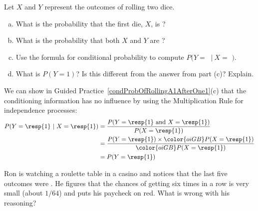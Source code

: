 \begin{exercisewrap}
\begin{nexercise} \label{condProbOfRollingA1AfterOne1}
Let $X$ and $Y$ represent the outcomes of rolling two dice.\footnotemark
\begin{enumerate}[(a)]
\item What is the probability that the first die, $X$, is ?
\item What is the probability that both $X$ and $Y$ are ?
\item Use the formula for conditional probability to compute $P(Y =$ $\ |\ X = $ $)$.
\item What is $P(Y=1)$? Is this different from the answer from part (c)? Explain.
\end{enumerate}
\end{nexercise}
\end{exercisewrap}

We can show in Guided Practice~\ref{condProbOfRollingA1AfterOne1}(c) that the conditioning information has no influence by using the Multiplication Rule for independence processes:
\begin{align*}
P(Y=\text{\resp{1}}\ |\ X=\text{\resp{1}})
    &= \frac{P(Y=\text{\resp{1} and }X=\text{\resp{1}})}
      {P(X=\text{\resp{1}})} \\
    &= \frac{P(Y=\text{\resp{1}}) \times
        \color{oiGB}P(X=\text{\resp{1}})}
      {\color{oiGB}P(X=\text{\resp{1}})} \\
    &= P(Y=\text{\resp{1}}) \\
\end{align*}

\begin{exercisewrap}
\begin{nexercise}
Ron is watching a roulette table in a casino and notices that the last five outcomes were . He figures that the chances of getting  six times in a row is very small (about $1/64$) and puts his paycheck on red. What is wrong with his reasoning?\footnotemark
\end{nexercise}
\end{exercisewrap}


